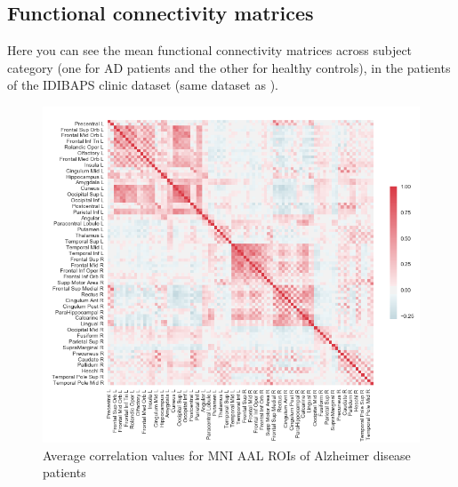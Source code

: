 	
		

\subsection{Functional connectivity matrices}\label{annex_functional_connectivities}

Here you can see the mean functional connectivity matrices across subject category (one for AD patients and the other for healthy controls), in the patients of the IDIBAPS clinic dataset (same dataset as \cite{Demirtas2017343}).


\begin{figure}[h]
	\centering
	\includegraphics[width=\textwidth]{mitjana_ROIxROI_ALZHEIMER_ELIMINATS15PROBLEMATICS.png}
	\caption{Average correlation values for MNI AAL ROIs of Alzheimer disease patients}
\end{figure}


